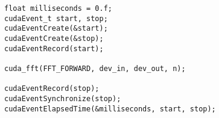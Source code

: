 \lstset{language=C++}
\begin{lstlisting}
float milliseconds = 0.f;
cudaEvent_t start, stop;
cudaEventCreate(&start);
cudaEventCreate(&stop);
cudaEventRecord(start);

cuda_fft(FFT_FORWARD, dev_in, dev_out, n);

cudaEventRecord(stop);
cudaEventSynchronize(stop);
cudaEventElapsedTime(&milliseconds, start, stop);
\end{lstlisting}